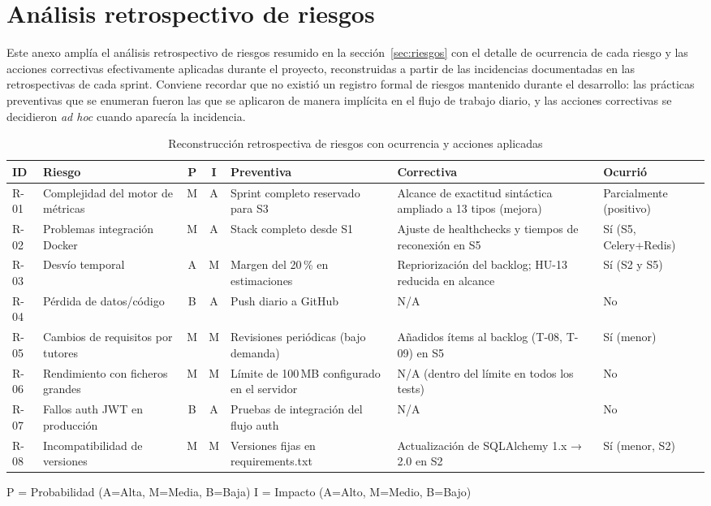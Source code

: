 \chapter{Análisis retrospectivo de riesgos}
\label{anx:riesgos}

Este anexo amplía el análisis retrospectivo de riesgos resumido en la
sección~\ref{sec:riesgos} con el detalle de ocurrencia de cada riesgo y
las acciones correctivas efectivamente aplicadas durante el proyecto,
reconstruidas a partir de las incidencias documentadas en las
retrospectivas de cada sprint.  Conviene recordar que no existió un
registro formal de riesgos mantenido durante el desarrollo: las
prácticas preventivas que se enumeran fueron las que se aplicaron de
manera implícita en el flujo de trabajo diario, y las acciones
correctivas se decidieron \emph{ad hoc} cuando aparecía la incidencia.

\begin{table}[htbp]
  \centering
  \small
  \caption{Reconstrucción retrospectiva de riesgos con ocurrencia y acciones aplicadas}
  \begin{tabularx}{\textwidth}{l >{\hsize=0.9\hsize}X c c >{\hsize=1.15\hsize}X >{\hsize=1.15\hsize}X >{\hsize=0.8\hsize}X}
    \toprule
    \textbf{ID} & \textbf{Riesgo} & \textbf{P} & \textbf{I} &
      \textbf{Preventiva} & \textbf{Correctiva} & \textbf{Ocurrió} \\
    \midrule
    R-01 & Complejidad del motor de métricas & M & A &
      Sprint completo reservado para S3 &
      Alcance de exactitud sintáctica ampliado a 13 tipos (mejora) &
      Parcialmente (positivo) \\
    R-02 & Problemas integración Docker & M & A &
      Stack completo desde S1 &
      Ajuste de healthchecks y tiempos de reconexión en S5 &
      Sí (S5, Celery+Redis) \\
    R-03 & Desvío temporal & A & M &
      Margen del 20\,\% en estimaciones &
      Repriorización del backlog; HU-13 reducida en alcance &
      Sí (S2 y S5) \\
    R-04 & Pérdida de datos/código & B & A &
      Push diario a GitHub &
      N/A &
      No \\
    R-05 & Cambios de requisitos por tutores & M & M &
      Revisiones periódicas (bajo demanda) &
      Añadidos ítems al backlog (T-08, T-09) en S5 &
      Sí (menor) \\
    R-06 & Rendimiento con ficheros grandes & M & M &
      Límite de 100\,MB configurado en el servidor &
      N/A (dentro del límite en todos los tests) &
      No \\
    R-07 & Fallos auth JWT en producción & B & A &
      Pruebas de integración del flujo auth &
      N/A &
      No \\
    R-08 & Incompatibilidad de versiones & M & M &
      Versiones fijas en requirements.txt &
      Actualización de SQLAlchemy 1.x → 2.0 en S2 &
      Sí (menor, S2) \\
    \bottomrule
  \end{tabularx}
  \medskip\par\small
  P = Probabilidad (A=Alta, M=Media, B=Baja) \quad
  I = Impacto (A=Alto, M=Medio, B=Bajo)
\end{table}

